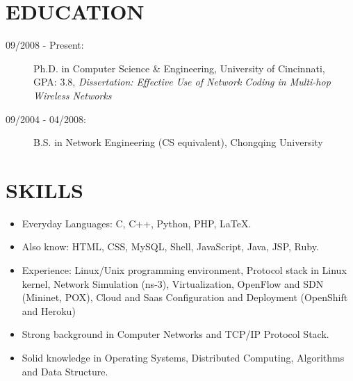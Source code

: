 \documentclass[line]{res}
\begin{document}
\address{226 Ludlow Ave Apt 11 \\ Cincinnati, OH 45220 \\ 513-679-0772}
\address{Email: \href{mailto:yang@yangchi.me}{yang@yangchi.me} \\ Github: \url{https://github.com/yangchi} }

\begin{resume}
	\section{EDUCATION}
	\begin{description}
		\item[09/2008 - Present:] Ph.D. in Computer Science \& Engineering, University of Cincinnati, \\
			GPA: 3.8, \emph{Dissertation: Effective Use of Network Coding in Multi-hop Wireless Networks}
		\item[09/2004 - 04/2008:] B.S. in Network Engineering (CS equivalent), Chongqing University
	\end{description}
	
	\section{SKILLS}
	\begin{itemize}
		\item Everyday Languages: C, C++, Python, PHP, LaTeX.
		\item Also know: HTML, CSS, MySQL, Shell, JavaScript, Java, JSP, Ruby.
		\item Experience: Linux/Unix programming environment, Protocol stack in Linux kernel, Network Simulation (ns-3), Virtualization, OpenFlow and SDN (Mininet, POX), Cloud and Saas Configuration and Deployment (OpenShift and Heroku)
		\item Strong background in Computer Networks and TCP/IP Protocol Stack.
		\item Solid knowledge in Operating Systems, Distributed Computing, Algorithms and Data Structure.
	\end{itemize}


\end{resume}
\end{document}
